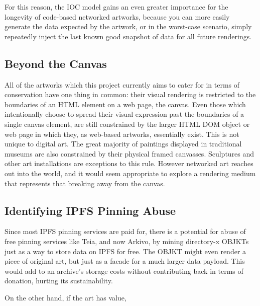 For this reason, the IOC model gains an even greater importance for the longevity of code-based networked artworks, because you can more easily generate the data expected by the artwork, or in the worst-case scenario, simply repeatedly inject the last known good snapshot of data for all future renderings.

\subsection{Beyond the Canvas}

All of the artworks which this project currently aims to cater for in terms of conservation have one thing in common: their visual rendering is restricted to the boundaries of an HTML element on a web page, the canvas. Even those which intentionally choose to spread their visual expression past the boundaries of a single canvas element, are still constrained by the larger HTML DOM object or web page in which they, as web-based artworks, essentially exist. This is not unique to digital art. The great majority of paintings displayed in traditional museums are also constrained by their physical framed canvasses. Sculptures and other art installations are exceptions to this rule. However networked art reaches out into the world, and it would seem appropriate to explore a rendering medium that represents that breaking away from the canvas.


\subsection{Identifying IPFS Pinning Abuse}

Since most IPFS pinning services are paid for, there is a potential for abuse of free pinning services like Teia, and now Arkivo, by mining directory-x OBJKTs just as a way to store data on IPFS for free. The OBJKT might even render a piece of original art, but just as a facade for a much larger data payload. This would add to an archive's storage costs without contributing back in terms of donation, hurting its sustainability.


On the other hand, if the art has value, 

